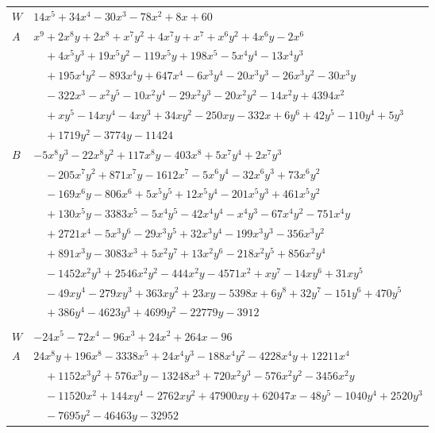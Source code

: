 \documentclass[11pt]{article}
\begin{document}
\begin{longtable}{@{}ll@{}}
$W$ & $14x^{5}+34x^{4}-30x^{3}-78x^{2}+8x+60$\\
$A$ & $x^{9}+2x^{8}y+2x^{8}+x^{7}y^{2}+4x^{7}y+x^{7}+x^{6}y^{2}+4x^{6}y-2x^{6}$\\
 & $\quad +4x^{5}y^{3}+19x^{5}y^{2}-119x^{5}y+198x^{5}-5x^{4}y^{4}-13x^{4}y^{3}$\\
 & $\quad +195x^{4}y^{2}-893x^{4}y+647x^{4}-6x^{3}y^{4}-20x^{3}y^{3}-26x^{3}y^{2}-30x^{3}y$\\
 & $\quad -322x^{3}-x^{2}y^{5}-10x^{2}y^{4}-29x^{2}y^{3}-20x^{2}y^{2}-14x^{2}y+4394x^{2}$\\
 & $\quad +xy^{5}-14xy^{4}-4xy^{3}+34xy^{2}-250xy-332x+6y^{6}+42y^{5}-110y^{4}+5y^{3}$\\
 & $\quad +1719y^{2}-3774y-11424$\\
$B$ & $-5x^{8}y^{3}-22x^{8}y^{2}+117x^{8}y-403x^{8}+5x^{7}y^{4}+2x^{7}y^{3}$\\
 & $\quad -205x^{7}y^{2}+871x^{7}y-1612x^{7}-5x^{6}y^{4}-32x^{6}y^{3}+73x^{6}y^{2}$\\
 & $\quad -169x^{6}y-806x^{6}+5x^{5}y^{5}+12x^{5}y^{4}-201x^{5}y^{3}+461x^{5}y^{2}$\\
 & $\quad +130x^{5}y-3383x^{5}-5x^{4}y^{5}-42x^{4}y^{4}-x^{4}y^{3}-67x^{4}y^{2}-751x^{4}y$\\
 & $\quad +2721x^{4}-5x^{3}y^{6}-29x^{3}y^{5}+32x^{3}y^{4}-199x^{3}y^{3}-356x^{3}y^{2}$\\
 & $\quad +891x^{3}y-3083x^{3}+5x^{2}y^{7}+13x^{2}y^{6}-218x^{2}y^{5}+856x^{2}y^{4}$\\
 & $\quad -1452x^{2}y^{3}+2546x^{2}y^{2}-444x^{2}y-4571x^{2}+xy^{7}-14xy^{6}+31xy^{5}$\\
 & $\quad -49xy^{4}-279xy^{3}+363xy^{2}+23xy-5398x+6y^{8}+32y^{7}-151y^{6}+470y^{5}$\\
 & $\quad +386y^{4}-4623y^{3}+4699y^{2}-22779y-3912$\\
\addlinespace[3pt]
\multicolumn{2}{@{}l}{$g=2$, $i=38$, $m=12$, neighbours $6,9,14,19,21,29,30$}\\
$W$ & $-24x^{5}-72x^{4}-96x^{3}+24x^{2}+264x-96$\\
$A$ & $24x^{8}y+196x^{8}-3338x^{5}+24x^{4}y^{3}-188x^{4}y^{2}-4228x^{4}y+12211x^{4}$\\
 & $\quad +1152x^{3}y^{2}+576x^{3}y-13248x^{3}+720x^{2}y^{3}-576x^{2}y^{2}-3456x^{2}y$\\
 & $\quad -11520x^{2}+144xy^{4}-2762xy^{2}+47900xy+62047x-48y^{5}-1040y^{4}+2520y^{3}$\\
 & $\quad -7695y^{2}-46463y-32952$\\

\end{longtable}
\end{document}

